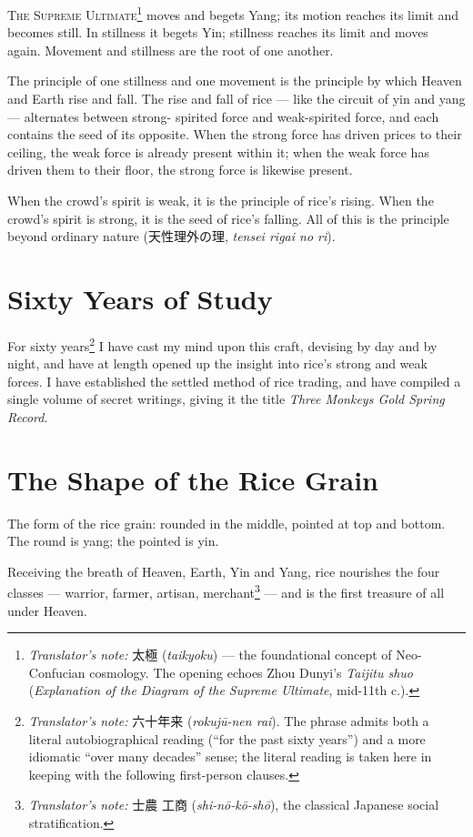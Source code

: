 \documentclass[10pt, openany]{book}
\newcommand{\jp}[1]{{\japanesefont #1}}
\newcommand{\tn}[1]{\footnote{\textit{Translator's note:} #1}}
\begin{document}
\lettrine[lines=2]{T}{he Supreme Ultimate}\tn{\jp{太極}
(\textit{taikyoku}) --- the foundational concept of Neo-Confucian
cosmology. The opening echoes Zhou Dunyi's \textit{Taijitu shuo}
(\textit{Explanation of the Diagram of the Supreme Ultimate},
mid-11th c.).} moves and begets Yang; its motion reaches its limit
and becomes still. In stillness it begets Yin; stillness reaches
its limit and moves again. Movement and stillness are the root of
one another.

The principle of one stillness and one movement is the principle
by which Heaven and Earth rise and fall. The rise and fall of rice
--- like the circuit of yin and yang --- alternates between strong-
spirited force and weak-spirited force, and each contains the seed
of its opposite. When the strong force has driven prices to their
ceiling, the weak force is already present within it; when the
weak force has driven them to their floor, the strong force is
likewise present.

When the crowd's spirit is weak, it is the principle of rice's
rising. When the crowd's spirit is strong, it is the seed of rice's
falling. All of this is the principle beyond ordinary nature
(\jp{天性理外の理}, \textit{tensei rigai no ri}).

\section{Sixty Years of Study}

For sixty years\tn{\jp{六十年来} (\textit{rokuj\=u-nen rai}). The
phrase admits both a literal autobiographical reading (``for the
past sixty years'') and a more idiomatic ``over many decades''
sense; the literal reading is taken here in keeping with the
following first-person clauses.} I have cast my mind upon this
craft, devising by day and by night, and have at length opened up
the insight into rice's strong and weak forces. I have established
the settled method of rice trading, and have compiled a single
volume of secret writings, giving it the title \textit{Three
Monkeys Gold Spring Record}.

\section{The Shape of the Rice Grain}

The form of the rice grain: rounded in the middle, pointed at top
and bottom. The round is yang; the pointed is yin.

Receiving the breath of Heaven, Earth, Yin and Yang, rice nourishes
the four classes --- warrior, farmer, artisan, merchant\tn{\jp{士農
工商} (\textit{shi-n\=o-k\=o-sh\=o}), the classical Japanese social
stratification.} --- and is the first treasure of all under Heaven.
\end{document}
